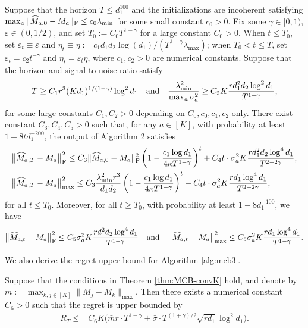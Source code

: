 \documentclass[12pt]{article}
\newcommand\fro[1]{\| #1 \|_{\rm{F}}}
\def\hat{\widehat}
\def\eps{\varepsilon}
\theoremstyle{plain}
\begin{document}
\begin{thm}\label{thm:MCB-convK}
Suppose that the horizon $T\leq d_1^{100}$ and the initializations are incoherent satisfying $\max_a{\|\hat M_{a,0}-M_a\|_{\rm F}}\leq c_0\lambda_{\min}$ for some small constant $c_0>0$.
        Fix some $\gamma\in [0,1)$, $\eps\in(0, 1/2)$, and set $T_0:=C_0T^{1-\gamma}$ for a large constant $C_0>0$.  When $t\leq T_0$, set $\eps_t\equiv\eps$ and $\eta_t\equiv \eta:=c_1d_1d_2\log(d_1)/(T^{1-\gamma}\lambda_{\max})$; when $T_0<t\leq T$, set $\eps_t=c_2t^{-\gamma}$ and $\eta_t=\eps_t \eta$, where $c_1, c_2>0$ are numerical constants. Suppose that the horizon and signal-to-noise ratio satisfy
        $$
        T\geq C_1r^3(Kd_1)^{1/(1-\gamma)} \log^2 d_1\quad {\rm and}\quad  \frac{\lambda_{\min}^2}{\max_a{\sigma_a^2}}\geq C_2K\frac{rd_1^2d_2\log^2d_1}{T^{1-\gamma}},
        $$
        for some large constants $C_1, C_2>0$ depending on $C_0, c_0,  c_1,c_2$ only. There exist constant $C_3,C_4,C_5 >0$ such that, for any $a\in [K]$, with probability at least $1-8td_1^{-200}$, the output of Algorithm 2 satisfies 
        \begin{align*}
            &\big\|\hat M_{a, T} - M_a \big\|_{\rm F}^2\leq C_3\fro{\widehat{M}_{a,0}-M_a}^2 \left(1-\frac{c_1\log d_1}{4\kappa T^{1-\gamma}}\right)^t + C_4t\cdot \sigma_a^2K\frac{rd_1^2d_2\log^4 d_1}{T^{2-2\gamma}}, \\
            &\big\|\hat M_{a,T} - M_a\big\|_{\max}^2\leq  C_3\frac{\lambda_{\min}^2r^3}{d_1d_2} \left(1-\frac{c_1\log d_1}{4\kappa T^{1-\gamma}}\right)^t +   C_4t\cdot \sigma_a^2K\frac{rd_1\log^4 d_1}{T^{2-2\gamma}},
        \end{align*}
for all $t\leq T_0$. Moreover, for all $t\geq T_0$, with probability at least $1-8d_1^{-100}$, we have
        \begin{align*}
            \big\|\hat M_{a, t} - M_a \big\|_{\rm F}^2\leq C_5\sigma_a^2K\frac{rd_1^2d_2\log^4 d_1}{T^{1-\gamma}} \quad {\rm and}\quad 
            \big\|\hat M_{a,t} - M_a\big\|_{\max}^2\leq C_5\sigma_a^2K\frac{rd_1\log^4 d_1}{T^{1-\gamma}}.
        \end{align*}
\end{thm} 
We also derive the regret upper bound for Algorithm \ref{alg:mcb3}.
\begin{thm} \label{thm:regretK}
  Suppose that  the conditions in Theorem \ref{thm:MCB-convK} hold, and denote by $\bar{m}:=\max_{k,j \in [K]}\|M_j-M_k\|_{\max}$. 
  Then there exists a numerical constant $C_6>0$ such that  the regret is upper bounded by 
\begin{align*}
        R_T\leq & C_6K\bigg(\bar m r\cdot T^{1-\gamma}+\bar\sigma\cdot T^{(1+\gamma)/2}\sqrt{rd_1}\log^2 d_1 \bigg).
 \end{align*}
\end{thm}
\end{document}
